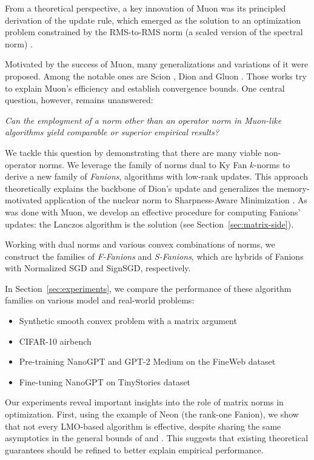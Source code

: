 \documentclass[a4paper,14pt,oneside]{extarticle}
\newcommand{\sectionref}[1]{Section~\ref{#1}}
\begin{document}
From a theoretical perspective, a key innovation of Muon was its principled derivation of the update rule, which emerged as the solution to an optimization problem constrained by the RMS-to-RMS norm (a scaled version of the spectral norm) \citep{bernstein2025deriving}.

Motivated by the success of Muon, many generalizations and variations of it were proposed. Among the notable ones are Scion \citep{pethick2025training}, Dion \citep{ahn2025dion} and Gluon \citep{riabinin2025gluon}. Those works try to explain Muon's efficiency and establish convergence bounds. One central question, however, remains unanswered:

\emph{Can the employment of a norm other than an operator norm in Muon-like algorithms yield comparable or superior empirical results?}

We tackle this question by demonstrating that there are many viable non-operator norms. We leverage the family of norms dual to Ky Fan $k$-norms to derive a new family of \emph{Fanions}, algorithms with low-rank updates. This approach theoretically explains the backbone of Dion's update \citep{ahn2025dion} and generalizes the memory-motivated application of the nuclear norm to Sharpness-Aware Minimization \citep{pethick2025sam}. As was done with Muon, we develop an effective procedure for computing Fanions' updates: the Lanczos algorithm is the solution (see \sectionref{sec:matrix-side}).

Working with dual norms and various convex combinations of norms, we construct the families of \emph{F-Fanions} and \emph{S-Fanions}, which are hybrids of Fanions with Normalized SGD and SignSGD, respectively.

In \sectionref{sec:experiments}, we compare the performance of these algorithm families on various model and real-world problems:
\begin{itemize}
  \item Synthetic smooth convex problem with a matrix argument
  \item CIFAR-10 airbench \citep{cifar2023airbench}
  \item Pre-training NanoGPT and GPT-2 Medium on the FineWeb dataset \citep{modded_nanogpt_2024}
  \item Fine-tuning NanoGPT on TinyStories dataset \citep{eldan2023tinystoriessmalllanguagemodels}
\end{itemize}

Our experiments reveal important insights into the role of matrix norms in optimization. First, using the example of Neon (the rank-one Fanion), we show that not every LMO-based algorithm is effective, despite sharing the same asymptotics in the general bounds of \citep{kovalev2025understanding} and \citep{riabinin2025gluon}. This suggests that existing theoretical guarantees should be refined to better explain empirical performance.
\end{document}
